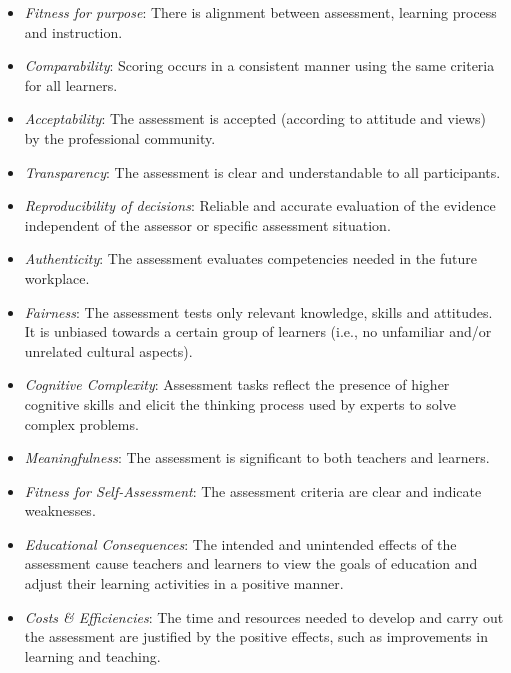 \begin{itemize}
\item \emph{Fitness for purpose}: There is alignment between assessment, learning process and instruction.

\item \emph{Comparability}: Scoring occurs in a consistent manner using the same criteria for all learners.

\item \emph{Acceptability}: The assessment is accepted (according to attitude and views) by the professional community.

\item \emph{Transparency}: The assessment is clear and understandable to all participants. 

\item \emph{Reproducibility of decisions}: Reliable and accurate evaluation of the evidence independent of the assessor or specific assessment situation. 

\item \emph{Authenticity}: The assessment evaluates competencies needed in the future workplace.

\item \emph{Fairness}: The assessment tests only relevant knowledge, skills and attitudes. It is unbiased towards a certain group of learners (i.e., no unfamiliar and/or unrelated cultural aspects).

\item \emph{Cognitive Complexity}: Assessment tasks reflect the presence of higher cognitive skills and elicit the thinking process used by experts to solve complex problems.

\item \emph{Meaningfulness}: The assessment is significant to both teachers and learners. 

\item \emph{Fitness for Self-Assessment}: The assessment criteria are clear and indicate weaknesses.

\item \emph{Educational Consequences}: The intended and unintended effects of the assessment cause teachers and learners to view the goals of education and adjust their learning activities in a positive manner.

\item \emph{Costs \& Efficiencies}: The time and resources needed to develop and carry out the assessment are justified by the positive effects, such as improvements in learning and teaching.

\end{itemize}



